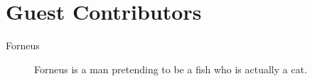 \section*{Guest Contributors}

\begin{description}
  \item[Forneus] Forneus is a man pretending to be a fish who is actually a cat.
\end{description}

